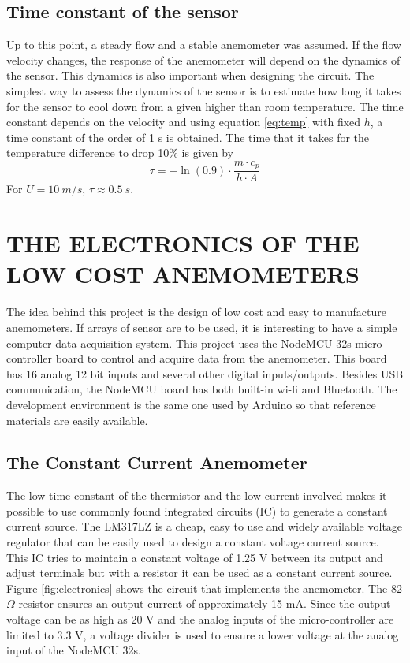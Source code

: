 \documentclass[10pt,fleqn,a4paper,twoside]{article}
\begin{document}
\subsection{Time constant of the sensor}

Up to this point, a steady flow and a stable anemometer was assumed. If the flow velocity changes, the response of the anemometer will depend on the dynamics of the sensor. This dynamics is also important when designing the circuit. The simplest way to assess the dynamics of the sensor is to estimate how long it takes for the sensor to cool down from a given higher than room temperature. The time constant depends on the velocity and using equation \ref{eq:temp} with fixed $h$, a time constant of the order of 1 s  is obtained. The time that it takes for the temperature difference to drop 10\% is given by
\begin{equation}
  \tau = -\ln(0.9) \cdot \frac{m\cdot c_p}{h\cdot A}
  \label{eq:timeconst}
\end{equation}
For $U=10\:m/s$, $\tau \approx 0.5\:s$.


\section{THE ELECTRONICS OF THE LOW COST ANEMOMETERS}
The idea behind this project is the design of low cost and easy to manufacture anemometers. If arrays of sensor are to be used, it is interesting to have a simple computer data acquisition system. This project uses the NodeMCU 32s micro-controller board to control and acquire data from the anemometer. This board has 16 analog 12 bit inputs and several other digital inputs/outputs. Besides USB communication, the NodeMCU board has both built-in wi-fi and Bluetooth. The development environment is the same one used by Arduino so that reference materials are easily available.

\subsection{The Constant Current Anemometer}
The low time constant of the thermistor and the low current involved makes it possible to use commonly found integrated circuits (IC) to generate a constant current source. The LM317LZ is a cheap, easy to use and widely available voltage regulator that can be easily used to design a constant voltage current source. This IC tries to maintain a constant voltage of 1.25 V between its output and adjust terminals but with a resistor it can be used as a constant current source. Figure \ref{fig:electronics} shows the circuit that implements the anemometer. The 82 $\Omega$ resistor ensures an output current of approximately 15 mA. Since the output voltage can be as high as 20 V and the analog inputs of the micro-controller are limited to 3.3 V, a voltage divider is used to ensure a lower voltage at the analog input of the NodeMCU 32s.
\end{document}
